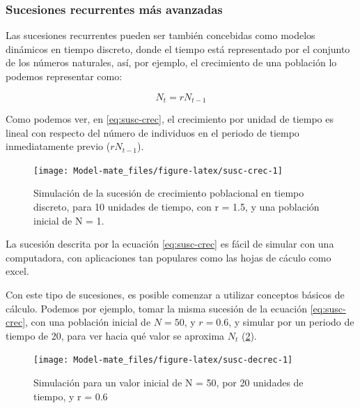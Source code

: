 \documentclass[
]{book}
\begin{document}
\hypertarget{sucesiones-recurrentes-muxe1s-avanzadas}{%
\subsubsection{Sucesiones recurrentes más avanzadas}\label{sucesiones-recurrentes-muxe1s-avanzadas}}

Las sucesiones recurrentes pueden ser también concebidas como modelos dinámicos en tiempo discreto, donde el tiempo está representado por el conjunto de los números naturales, así, por ejemplo, el crecimiento de una población lo podemos representar como:

\begin{equation}
    N_{t} = r N_{t-1} \label{eq:susc-crec}
\end{equation}

Como podemos ver, en \eqref{eq:susc-crec}, el crecimiento por unidad de tiempo es lineal con respecto del número de individuos en el periodo de tiempo inmediatamente previo (\(rN_{t-1}\)).

\begin{figure}

{\centering \texttt{[image: Model-mate\_files/figure-latex/susc-crec-1]} 

}

\caption{Simulación de la sucesión de crecimiento poblacional en tiempo discreto, para 10 unidades de tiempo, con r = 1.5, y una población inicial de N = 1.}\label{fig:susc-crec}
\end{figure}

La sucesión descrita por la ecuación \eqref{eq:susc-crec} es fácil de simular con una computadora, con aplicaciones tan populares como las hojas de cáculo como excel.

Con este tipo de sucesiones, es posible comenzar a utilizar conceptos básicos de cálculo. Podemos por ejemplo, tomar la misma sucesión de la ecuación \eqref{eq:susc-crec}, con una población inicial de \(N = 50\), y \(r = 0.6\), y simular por un periodo de tiempo de 20, para ver hacia qué valor se aproxima \(N_t\) (\ref{fig:susc-decrec}).

\begin{figure}

{\centering \texttt{[image: Model-mate\_files/figure-latex/susc-decrec-1]} 

}

\caption{Simulación para un valor inicial de N = 50, por 20 unidades de tiempo, y r = 0.6}\label{fig:susc-decrec}
\end{figure}
\end{document}
